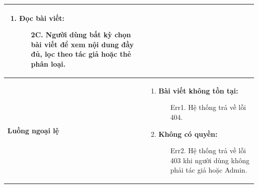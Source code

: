 {\begin{tabularx}{\textwidth}{|>{\raggedright\arraybackslash}X|>{\raggedright\arraybackslash}X|}
\begin{enumerate}
\begin{enumerate}
    \end{enumerate}
    \item \textbf{Đọc bài viết:}
    \begin{enumerate}
        \item[2C.] Người dùng bất kỳ chọn bài viết để xem nội dung đầy đủ, lọc theo tác giả hoặc thẻ phân loại.
    \end{enumerate}
\end{enumerate} \\
\hline
\textbf{Luồng ngoại lệ} &
\begin{enumerate}
    \item \textbf{Bài viết không tồn tại:}
    \begin{enumerate}
        \item[Err1.] Hệ thống trả về lỗi 404.
    \end{enumerate}
    \item \textbf{Không có quyền:}
    \begin{enumerate}
        \item[Err2.] Hệ thống trả về lỗi 403 khi người dùng không phải tác giả hoặc Admin.
    \end{enumerate}
\end{enumerate} \\
\hline
\end{tabularx}
}
